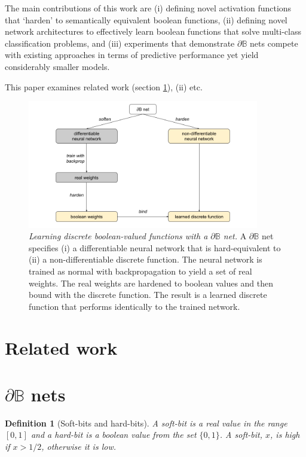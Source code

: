 \documentclass{article} %
\newtheorem*{definition}{Definition}
\begin{document}
The main contributions of this work are (i) defining novel activation functions that `harden' to semantically equivalent boolean functions, (ii) defining novel network architectures to effectively learn boolean functions that solve multi-class classification problems, and (iii) experiments that demonstrate $\partial \mathbb{B}$ nets compete with existing approaches in terms of predictive performance yet yield considerably smaller models.

This paper examines related work (section \ref{sec:related-work}), (ii) etc.

\begin{figure}[h]
	\centering
	\includegraphics[width=0.9\textwidth]{db-net.png}
	\caption{{\em Learning discrete boolean-valued functions with a $\partial\mathbb{B}$ net.} A $\partial \mathbb{B}$ net specifies (i) a differentiable neural network that is hard-equivalent to (ii) a non-differentiable discrete function. The neural network is trained as normal with backpropagation to yield a set of real weights. The real weights are hardened to boolean values and then bound with the discrete function. The result is a learned discrete function that performs identically to the trained network.}
	\label{fig:main-idea}
\end{figure}


\section{Related work}\label{sec:related-work}

\section{$\partial\mathbb{B}$ nets}

\begin{definition}[Soft-bits and hard-bits]
A {\em soft-bit} is a real value in the range $[0,1]$ and a {\em hard-bit} is a boolean value from the set $\{0,1\}$. A soft-bit, $x$, is {\em high} if $x>1/2$, otherwise it is {\em low}.
\end{definition}
\end{document}

